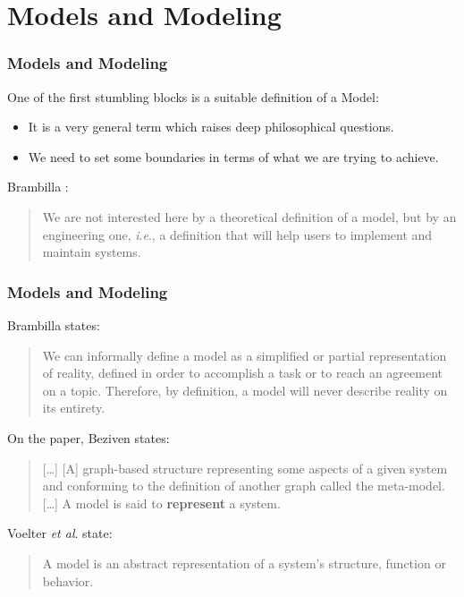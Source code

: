 \documentclass{beamer}
\newcommand{\etal}{\textit{et al}. }
\newcommand{\ie}{\textit{i}.\textit{e}., }
\begin{document}
\section{Models and Modeling}

\begin{frame}
\frametitle{Models and Modeling}

One of the first stumbling blocks is a suitable definition of a
Model:
\pause

\begin{itemize}
\item It is a very general term which raises deep philosophical
  questions.
  \pause
\item We need to set some boundaries in terms of what we are trying to
  achieve.
  \pause
\end{itemize}

Brambilla \cite{brambilla2012model}:

\begin{quote}
We are not interested here by a theoretical definition of a model, but
by an engineering one, \ie a definition that will help users to
implement and maintain systems.
\end{quote}

\end{frame}

\begin{frame}
\frametitle{Models and Modeling}

Brambilla\cite{brambilla2012model} states:

\begin{quote}
We can informally define a model as a simplified or partial
representation of reality, defined in order to accomplish a task or to
reach an agreement on a topic. Therefore, by definition, a model will
never describe reality on its entirety.
\end{quote}

\pause

On the paper, Beziven states:

\begin{quote}
[\ldots] [A] graph-based structure representing some aspects of a
given system and conforming to the definition of another graph called
the meta-model. [\ldots] A model is said to \textbf{represent} a
system.
\end{quote}

\pause

Voelter \etal\cite{völter2013model} state:

\begin{quote}
A model is an abstract representation of a system’s structure,
function or behavior.
\end{quote}

\end{frame}
\end{document}
